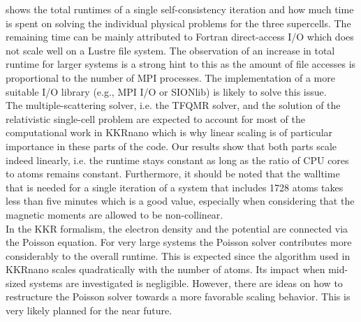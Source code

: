 \documentclass [a4paper, 12pt]{article}
\begin{document}
shows the total runtimes of a single self-consistency iteration and how much time is spent
on solving the individual physical problems for the three supercells.
The remaining time
can be mainly attributed to Fortran direct-access I/O which does not scale well on a Lustre file system.
The observation of an increase in total runtime for larger systems is a strong hint to this as the amount of
file accesses is proportional to the number of MPI processes.
The implementation of a more suitable I/O library (e.g., MPI I/O or SIONlib) is likely to solve this issue.
\\
The multiple-scattering solver, i.e. the TFQMR solver, 
and the solution of the relativistic single-cell problem are
expected to account for most of the computational work in KKRnano which 
is why linear scaling is of particular importance in these parts of the code.
Our results show that both parts scale indeed linearly, i.e. the runtime stays constant as long as
the ratio of CPU cores to atoms remains constant.
Furthermore, it should be noted that the walltime that is needed for a single iteration of a system
that includes 1728 atoms
takes less than five minutes which is a good value, especially when considering that
the magnetic moments are allowed to be non-collinear.
\\
In the KKR formalism, the electron density and the potential are connected via the Poisson equation. 
For very large systems the Poisson solver contributes more considerably to the overall runtime.
This is expected since the algorithm used in KKRnano scales
quadratically with the number of atoms. Its impact when mid-sized systems are investigated is negligible. 
However, there are ideas on how to restructure the Poisson solver towards a more favorable scaling behavior.
This is very likely planned for the near future.\\
\end{document}
